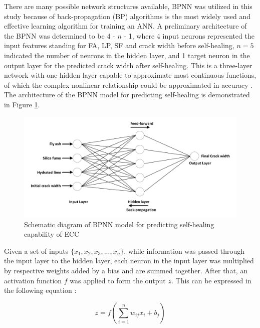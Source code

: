 \documentclass[11pt]{article}
\begin{document}
	There are many possible network structures available, BPNN was utilized in this study because of back-propagation (BP) algorithms is the most widely used and effective learning algorithm for training an ANN. A preliminary architecture of the BPNN was determined to be 4 - $n$ - 1, where 4 input neurons represented the input features standing for FA, LP, SF and crack width before self-healing, $n = 5$ indicated the number of neurons in the hidden layer, and 1 target neuron in the output layer for the predicted crack width after self-healing. This is a three-layer network with one hidden layer capable to approximate most continuous functions, of which the complex nonlinear relationship could be approximated in accuracy \cite{yan2017evaluation}. The architecture of the BPNN model for predicting self-healing is demonstrated in Figure \ref{fig:BPNN}. %
	
	\begin{figure}[!]
		\begin{center}
			\includegraphics[width=\textwidth]{BPNN.pdf}
		\end{center}
		\caption{Schematic diagram of BPNN model for predicting self-healing capability of ECC}
		\label{fig:BPNN}
	\end{figure}
	
	Given a set of inputs $ \{ x_1, x_2,x_3,..., x_n\}$, while information was passed through the input layer to the hidden layer, each neuron in the input layer was multiplied by respective weights added by a bias and are summed together. After that, an activation function $f$ was applied to form the output $z$. This can be expressed in the following equation \cite{alshihri2009neural}:
	
	\begin{equation}
	z = f(\sum_{i=1}^{n} w_{ij}x_i + b_j)
	\end{equation}
	
\end{document}
